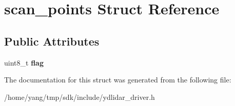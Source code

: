 \hypertarget{structscan__points}{}\section{scan\+\_\+points Struct Reference}
\label{structscan__points}
\subsection*{Public Attributes}
\begin{DoxyCompactItemize}
\item 
uint8\+\_\+t {\bfseries flag}\hypertarget{structscan__points_ae2f1ac4c7f2d11a3db2eec0da4eae66e}{}\label{structscan__points_ae2f1ac4c7f2d11a3db2eec0da4eae66e}

\end{DoxyCompactItemize}


The documentation for this struct was generated from the following file\+:\begin{DoxyCompactItemize}
\item 
/home/yang/tmp/sdk/include/ydlidar\+\_\+driver.\+h\end{DoxyCompactItemize}
